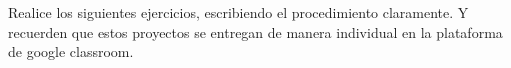 \documentclass[letterpaper,11pt]{article}
\newcommand{\informacion}[1]{
\begin{center}
\fbox{\fbox{\parbox{\textwidth}{{\footnotesize#1}}}}
\end{center}
\vspace{5mm}}
\begin{document}


 
\noindent Realice los siguientes ejercicios, escribiendo el procedimiento claramente. Y recuerden que estos proyectos se entregan de manera individual en la plataforma de google classroom. 
\end{document}
